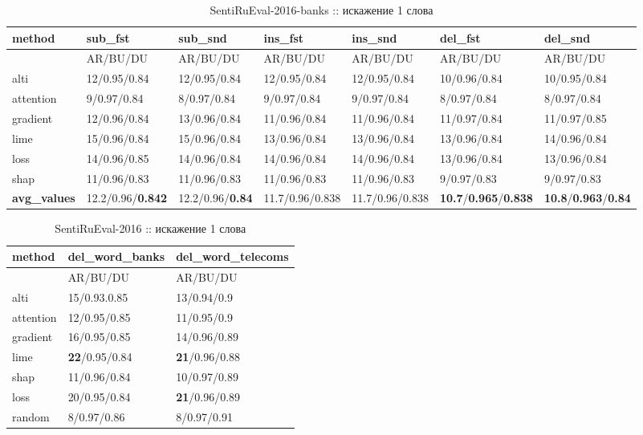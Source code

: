 \begin{table}
  \caption*{SentiRuEval-2016-banks :: искажение 1 слова}
  {\renewcommand{\arraystretch}{1.5}
  {\fontsize{8pt}{8pt}\selectfont
  \begin{tabularx}{1.15\textwidth}{|l|X|X|X|X|X|X|}
    \hline
     method  & sub\_fst  & sub\_snd & ins\_fst  & ins\_snd & del\_fst  & del\_snd \\
    \hline
     & AR/BU/DU & AR/BU/DU & AR/BU/DU & AR/BU/DU & AR/BU/DU & AR/BU/DU \\
    \hline
     alti      & 12/0.95/0.84 & 12/0.95/0.84 & 12/0.95/0.84 & 12/0.95/0.84 & 10/0.96/0.84 & 10/0.95/0.84 \\
    \hline
     attention & 9/0.97/0.84  & 8/0.97/0.84 & 9/0.97/0.84  & 9/0.97/0.84 & 8/0.97/0.84  & 8/0.97/0.84 \\
    \hline
     gradient  & 12/0.96/0.84 & 13/0.96/0.84 & 11/0.96/0.84 & 11/0.96/0.84 & 11/0.97/0.84 & 11/0.97/0.85 \\
    \hline
     lime      & 15/0.96/0.84 & 15/0.96/0.84 & 13/0.96/0.84 & 13/0.96/0.84 & 13/0.96/0.84 & 14/0.96/0.84 \\
    \hline
     loss      & 14/0.96/0.85 & 14/0.96/0.84 & 14/0.96/0.84 & 14/0.96/0.84 & 13/0.96/0.84 & 13/0.96/0.84 \\
    \hline
     shap      & 11/0.96/0.83 & 11/0.96/0.83 & 11/0.96/0.83 & 11/0.96/0.83 & 9/0.97/0.83  & 9/0.97/0.83 \\
    \hline
    \textbf{avg\_values} & 12.2/0.96/\textbf{0.842} & 12.2/0.96/\textbf{0.84} & 11.7/0.96/0.838 & 11.7/0.96/0.838 & \textbf{10.7}/\textbf{0.965}/\textbf{0.838} & \textbf{10.8}/\textbf{0.963}/\textbf{0.84} \\
    \hline
    \end{tabularx}
    }
    }
\end{table}


\begin{table}[H]
  \centering
  \caption*{SentiRuEval-2016 :: искажение 1 слова}
  {\renewcommand{\arraystretch}{1.5}
  {\fontsize{11pt}{10pt}\selectfont
  \begin{tabularx}{0.6\textwidth}{|l|X|X|}
    \hline
     method    & del\_word\_banks         & del\_word\_telecoms  \\
    \hline
     & AR/BU/DU  & AR/BU/DU \\
    \hline
     alti      & 15/0.93.0.85 & 13/0.94/0.9 \\
    \hline
     attention & 12/0.95/0.85  & 11/0.95/0.9 \\
    \hline
     gradient  & 16/0.95/0.85 & 14/0.96/0.89 \\
    \hline
     lime      & \textbf{22}/0.95/0.84 & \textbf{21}/0.96/0.88 \\
    \hline
     shap      & 11/0.96/0.84 & 10/0.97/0.89 \\
    \hline
     loss      & 20/0.95/0.84 & \textbf{21}/0.96/0.89 \\
    \hline
     random    & 8/0.97/0.86 & 8/0.97/0.91 \\
    \hline
    \end{tabularx}
    }
    }
\end{table}